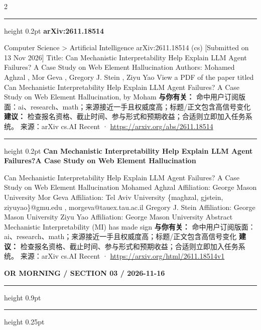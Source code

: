 \documentclass[10.5pt]{ctexart}
\begin{document}
\begin{multicols}{2}
\vspace{2mm}
\hrule height 0.2pt
\vspace{2mm}
{\large\bfseries arXiv:2611.18514}\par
Computer Science > Artificial Intelligence arXiv:2611.18514 (cs) [Submitted on 13 Nov 2026] Title: Can Mechanistic Interpretability Help Explain LLM Agent Failures? A Case Study on Web Element Hallucination Authors: Mohamed Aghzal , Mor Geva , Gregory J. Stein , Ziyu Yao View a PDF of the paper titled Can Mechanistic Interpretability Help Explain LLM Agent Failures? A Case Study on Web Element Hallucination, by Moham
\textbf{与你有关：} 命中用户订阅版面：ai、research、math；来源接近一手且权威度高；标题/正文包含高信号变化
\textbf{建议：} 检查报名资格、截止时间、参与形式和预期收益；合适则立即加入任务系统。
{\footnotesize\color{ormuted} 来源：arXiv cs.AI Recent · \url{https://arxiv.org/abs/2611.18514}}
\vspace{2mm}
\hrule height 0.2pt
\vspace{2mm}
{\large\bfseries Can Mechanistic Interpretability Help Explain LLM Agent Failures?A Case Study on Web Element Hallucination}\par
Can Mechanistic Interpretability Help Explain LLM Agent Failures? A Case Study on Web Element Hallucination Mohamed Aghzal Affiliation: George Mason University Mor Geva Affiliation: Tel Aviv University \{maghzal, gjstein, ziyuyao\}@gmu.edu , morgeva@tauex.tau.ac.il Gregory J. Stein Affiliation: George Mason University Ziyu Yao Affiliation: George Mason University Abstract Mechanistic Interpretability (MI) has made sign
\textbf{与你有关：} 命中用户订阅版面：ai、research、math；来源接近一手且权威度高；标题/正文包含高信号变化
\textbf{建议：} 检查报名资格、截止时间、参与形式和预期收益；合适则立即加入任务系统。
{\footnotesize\color{ormuted} 来源：arXiv cs.AI Recent · \url{https://arxiv.org/html/2611.18514v1}}
\end{multicols}
\newpage
{\small\bfseries OR MORNING / SECTION 03 / 2026-11-16}
\vspace{2mm}
\hrule height 0.9pt
\vspace{1.5mm}
\hrule height 0.25pt
\vspace{4mm}
\end{document}
